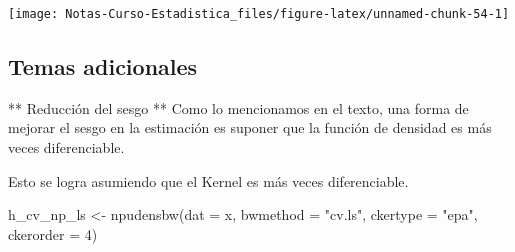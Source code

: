 \documentclass[
  12pt,
]{book}
\newenvironment{Shaded}{\begin{snugshade}}{\end{snugshade}}
\newcommand{\AttributeTok}[1]{\textcolor[rgb]{0.77,0.63,0.00}{#1}}
\newcommand{\DecValTok}[1]{\textcolor[rgb]{0.00,0.00,0.81}{#1}}
\newcommand{\FunctionTok}[1]{\textcolor[rgb]{0.00,0.00,0.00}{#1}}
\newcommand{\NormalTok}[1]{#1}
\newcommand{\OtherTok}[1]{\textcolor[rgb]{0.56,0.35,0.01}{#1}}
\newcommand{\SpecialCharTok}[1]{\textcolor[rgb]{0.00,0.00,0.00}{#1}}
\newcommand{\StringTok}[1]{\textcolor[rgb]{0.31,0.60,0.02}{#1}}
\theoremstyle{definition}
\theoremstyle{definition}
\theoremstyle{definition}
\theoremstyle{definition}
\theoremstyle{remark}
\begin{document}
\begin{Shaded}
\end{Shaded}

\begin{center}\texttt{[image: Notas-Curso-Estadistica\_files/figure-latex/unnamed-chunk-54-1]} \end{center}

\hypertarget{temas-adicionales}{%
\subsection{Temas adicionales}\label{temas-adicionales}}

** Reducción del sesgo ** Como lo mencionamos en el texto, una forma
de mejorar el sesgo en la estimación es suponer que la función de
densidad es más veces diferenciable.

Esto se logra asumiendo que el Kernel es más veces diferenciable.

\begin{Shaded}
\begin{Highlighting}[]
\NormalTok{h\_cv\_np\_ls }\OtherTok{\textless{}{-}} \FunctionTok{npudensbw}\NormalTok{(}\AttributeTok{dat =}\NormalTok{ x, }\AttributeTok{bwmethod =} \StringTok{"cv.ls"}\NormalTok{,}
    \AttributeTok{ckertype =} \StringTok{"epa"}\NormalTok{, }\AttributeTok{ckerorder =} \DecValTok{4}\NormalTok{)}
\end{Highlighting}
\end{Shaded}
\end{document}
